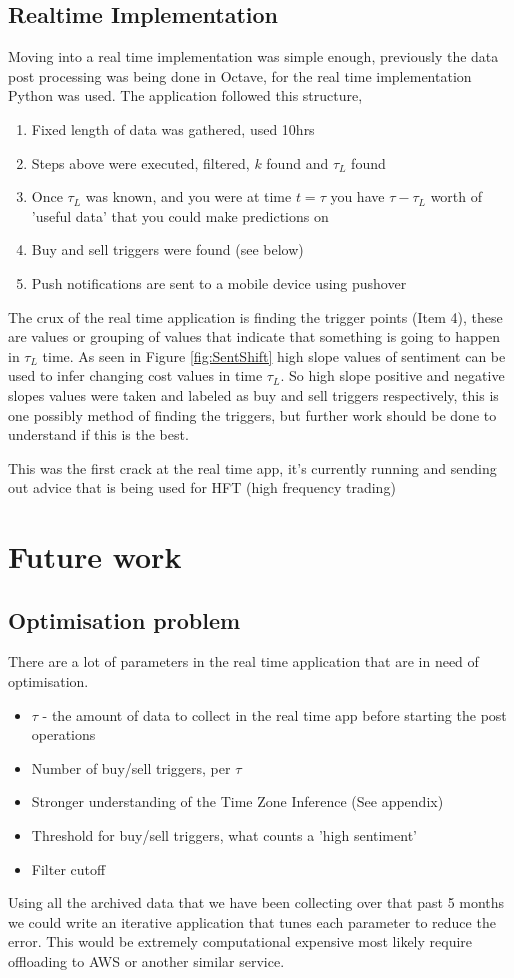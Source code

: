 \documentclass[12pt,journal,compsoc]{IEEEtran}
\begin{document}
\subsection{Realtime Implementation}
Moving into a real time implementation was simple enough, previously the data post processing was being done in Octave, for the 
real time implementation Python was used. The application followed this structure,
\begin{enumerate}
	\item Fixed length of data was gathered, used 10hrs
	\item Steps above were executed, filtered, $k$ found and $\tau_L$ found
	\item Once $\tau_L$ was known, and you were at time $t = \tau$ you have $\tau - \tau_L$ worth of 'useful data' that you could
	make predictions on
	\item Buy and sell triggers were found (see below)
	\item Push notifications are sent to a mobile device using pushover \cite{Pushover}
\end{enumerate}
The crux of the real time application is finding the trigger points (Item 4), these are 
values or grouping of values that indicate that something is going to 
happen in $\tau_L$ time. As seen in Figure \ref{fig:SentShift} high slope values of sentiment can be used 
to infer changing cost values in time $\tau_L$. So high slope positive and negative slopes values were taken and
labeled as buy and sell triggers respectively, this is one possibly method of finding the triggers, but further work
should be done to understand if this is the best. 

This was the first crack at the real time app, it's currently running and sending out advice that is being used for HFT (high 
frequency trading)
\section{Future work}
\subsection{Optimisation problem}
There are a lot of parameters in the real time application that are in need of optimisation. 
\begin{itemize}
	\item $\tau$ - the amount of data to collect in the real time app before starting the post operations
	\item Number of buy/sell triggers, per $\tau$
	\item Stronger understanding of the Time Zone Inference (See appendix)
	\item Threshold for buy/sell triggers, what counts a 'high sentiment'
	\item Filter cutoff
\end{itemize}
Using all the archived data that we have been collecting over that past 5 months we could write an iterative application that
tunes each parameter to reduce the error. This would be extremely computational expensive most likely require offloading to
AWS or another similar service. 
\end{document}
